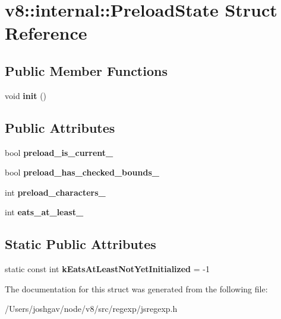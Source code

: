 \hypertarget{structv8_1_1internal_1_1_preload_state}{}\section{v8\+:\+:internal\+:\+:Preload\+State Struct Reference}
\label{structv8_1_1internal_1_1_preload_state}
\subsection*{Public Member Functions}
\begin{DoxyCompactItemize}
\item 
void {\bfseries init} ()\hypertarget{structv8_1_1internal_1_1_preload_state_a17d85eaccbac6f3aee69903ad5fb3648}{}\label{structv8_1_1internal_1_1_preload_state_a17d85eaccbac6f3aee69903ad5fb3648}

\end{DoxyCompactItemize}
\subsection*{Public Attributes}
\begin{DoxyCompactItemize}
\item 
bool {\bfseries preload\+\_\+is\+\_\+current\+\_\+}\hypertarget{structv8_1_1internal_1_1_preload_state_a80ab5e8b22cd6f8147148eddcd68024f}{}\label{structv8_1_1internal_1_1_preload_state_a80ab5e8b22cd6f8147148eddcd68024f}

\item 
bool {\bfseries preload\+\_\+has\+\_\+checked\+\_\+bounds\+\_\+}\hypertarget{structv8_1_1internal_1_1_preload_state_a615484cf86c9f9f74225429ac40c0def}{}\label{structv8_1_1internal_1_1_preload_state_a615484cf86c9f9f74225429ac40c0def}

\item 
int {\bfseries preload\+\_\+characters\+\_\+}\hypertarget{structv8_1_1internal_1_1_preload_state_ab2a09b111ad1ecc901bd3219e799b764}{}\label{structv8_1_1internal_1_1_preload_state_ab2a09b111ad1ecc901bd3219e799b764}

\item 
int {\bfseries eats\+\_\+at\+\_\+least\+\_\+}\hypertarget{structv8_1_1internal_1_1_preload_state_a64fb7ad1d7ed2245b44e2a9e0ae94be8}{}\label{structv8_1_1internal_1_1_preload_state_a64fb7ad1d7ed2245b44e2a9e0ae94be8}

\end{DoxyCompactItemize}
\subsection*{Static Public Attributes}
\begin{DoxyCompactItemize}
\item 
static const int {\bfseries k\+Eats\+At\+Least\+Not\+Yet\+Initialized} = -\/1\hypertarget{structv8_1_1internal_1_1_preload_state_a376c50368dd5b24b0029a99b2c6538b6}{}\label{structv8_1_1internal_1_1_preload_state_a376c50368dd5b24b0029a99b2c6538b6}

\end{DoxyCompactItemize}


The documentation for this struct was generated from the following file\+:\begin{DoxyCompactItemize}
\item 
/\+Users/joshgav/node/v8/src/regexp/jsregexp.\+h\end{DoxyCompactItemize}
